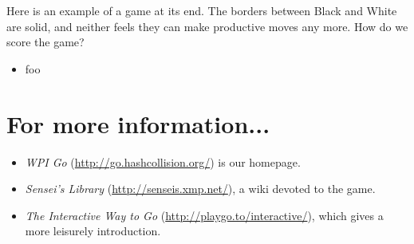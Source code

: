 \documentclass{article}
\begin{document}
Here is an example of a game at its end.
The borders between Black and White are solid, and neither feels they
can make productive moves any more.  How do we score the game?
\begin{itemize}
\item foo
\end{itemize}




\section*{For more information...}
\begin{itemize}
\item \emph{WPI Go} (\url{http://go.hashcollision.org/}) is our homepage.

\item \emph{Sensei's Library} (\url{http://senseis.xmp.net/}), a wiki
  devoted to the game.

\item \emph{The Interactive Way to Go}
  (\url{http://playgo.to/interactive/}), which gives a more leisurely
  introduction.
\end{itemize}
\end{document}
